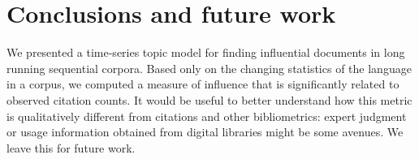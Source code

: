 



\section{Conclusions and future work}

We presented a time-series topic model for finding influential
documents in long running sequential corpora.  Based only on the
changing statistics of the language in a corpus, we computed a measure
of influence that is significantly related to observed citation
counts. It would be useful to better understand how this metric is
qualitatively different from citations and other bibliometrics: expert
judgment or usage information obtained from digital libraries might be
some avenues.  We leave this for future work.


